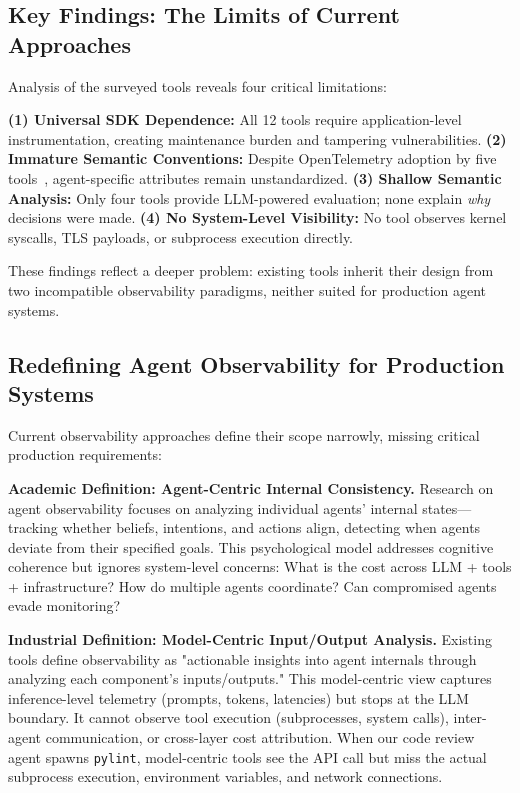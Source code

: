 \documentclass[sigplan,screen,9pt]{acmart}
\begin{document}
\subsection{Key Findings: The Limits of Current Approaches}

Analysis of the surveyed tools reveals four critical limitations:

\textbf{(1) Universal SDK Dependence:} All 12 tools require application-level instrumentation, creating maintenance burden and tampering vulnerabilities. \textbf{(2) Immature Semantic Conventions:} Despite OpenTelemetry adoption by five tools~\cite{Liu2025OTel}, agent-specific attributes remain unstandardized. \textbf{(3) Shallow Semantic Analysis:} Only four tools provide LLM-powered evaluation; none explain \emph{why} decisions were made. \textbf{(4) No System-Level Visibility:} No tool observes kernel syscalls, TLS payloads, or subprocess execution directly.

These findings reflect a deeper problem: existing tools inherit their design from two incompatible observability paradigms, neither suited for production agent systems.

\subsection{Redefining Agent Observability for Production Systems}

Current observability approaches define their scope narrowly, missing critical production requirements:

\textbf{Academic Definition: Agent-Centric Internal Consistency.} Research on agent observability focuses on analyzing individual agents' internal states—tracking whether beliefs, intentions, and actions align, detecting when agents deviate from their specified goals. This psychological model addresses cognitive coherence but ignores system-level concerns: What is the cost across LLM + tools + infrastructure? How do multiple agents coordinate? Can compromised agents evade monitoring?

\textbf{Industrial Definition: Model-Centric Input/Output Analysis.} Existing tools define observability as "actionable insights into agent internals through analyzing each component's inputs/outputs." This model-centric view captures inference-level telemetry (prompts, tokens, latencies) but stops at the LLM boundary. It cannot observe tool execution (subprocesses, system calls), inter-agent communication, or cross-layer cost attribution. When our code review agent spawns \texttt{pylint}, model-centric tools see the API call but miss the actual subprocess execution, environment variables, and network connections.
\end{document}
